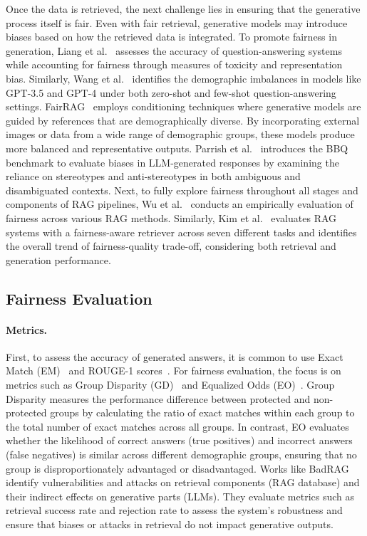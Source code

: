 Once the data is retrieved, the next challenge lies in ensuring that the generative process itself is fair. Even with fair retrieval, generative models may introduce biases based on how the retrieved data is integrated. To promote fairness in generation, Liang et al.~\cite{liang2022holistic} assesses the accuracy of question-answering systems while accounting for fairness through measures of toxicity and representation bias. Similarly, Wang et al.~\cite{wang2023decodingtrust} identifies the demographic imbalances in models like GPT-3.5 and GPT-4 under both zero-shot and few-shot question-answering settings. FairRAG~\cite{shrestha2024fairrag} employs conditioning techniques where generative models are guided by references that are demographically diverse. By incorporating external images or data from a wide range of demographic groups, these models produce more balanced and representative outputs. Parrish et al.~\cite{parrish2021bbq} introduces the BBQ benchmark to evaluate biases in LLM-generated responses by examining the reliance on stereotypes and anti-stereotypes in both ambiguous and disambiguated contexts. Next, to fully explore fairness throughout all stages and components of RAG pipelines, Wu et al.~\cite{wu2024does} conducts an empirically evaluation of fairness across various RAG methods. Similarly, Kim et al.~\cite{kim2024towards} evaluates RAG systems with a fairness-aware retriever across seven different tasks and identifies the overall trend of fairness-quality trade-off, considering both retrieval and generation performance.

\subsection{Fairness Evaluation}
\paragraph{Metrics.} First, to assess the accuracy of generated answers, it is common to use Exact Match (EM)~\cite{rajpurkar2016squad} and ROUGE-1 scores~\cite{lin2004rouge}. For fairness evaluation, the focus is on metrics such as Group Disparity (GD)~\cite{friedler2019comparative} and Equalized Odds (EO)~\cite{hardt2016equality}. Group Disparity measures the performance difference between protected and non-protected groups by calculating the ratio of exact matches within each group to the total number of exact matches across all groups. In contrast, EO evaluates whether the likelihood of correct answers (true positives) and incorrect answers (false negatives) is similar across different demographic groups, ensuring that no group is disproportionately advantaged or disadvantaged. Works like BadRAG~\cite{xue2024badrag} identify vulnerabilities and attacks on retrieval components (RAG database) and their indirect effects on generative parts (LLMs). They evaluate metrics such as retrieval success rate and rejection rate to assess the system's robustness and ensure that biases or attacks in retrieval do not impact generative outputs.

